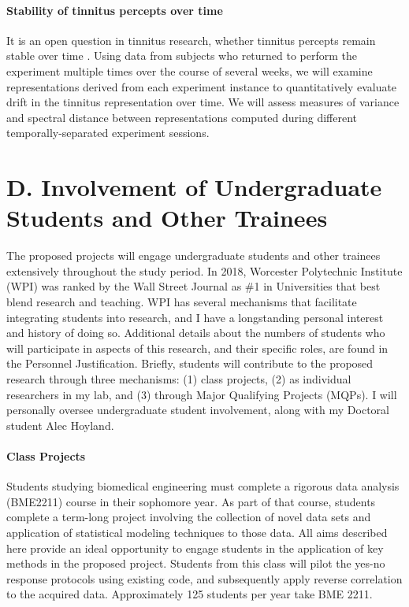 \documentclass[11pt, notitlepage]{article} %
\begin{document}
\paragraph{Stability of tinnitus percepts over time}

It is an open question in tinnitus research, whether tinnitus percepts remain stable over time
\cite{husainReplicabilityNeuralBehavioral2019}.
Using data from subjects who returned to perform the experiment multiple times
over the course of several weeks,
we will examine representations derived from each experiment instance
to quantitatively evaluate drift in the tinnitus representation over time.
We will assess measures of variance and spectral distance between representations
computed during different temporally-separated experiment sessions.

\section*{D. Involvement of Undergraduate Students and Other Trainees}

The proposed projects will engage undergraduate students and other trainees extensively throughout the study period.
In 2018, Worcester Polytechnic Institute (WPI) was ranked by the Wall Street Journal as \#1 in Universities that best blend research and teaching.
WPI has several mechanisms that facilitate integrating students into research, and I have a longstanding personal interest and history of doing so.
Additional details about the numbers of students who will participate in aspects of this research, and their specific roles, are found in the Personnel Justification.
Briefly, students will contribute to the proposed research through three mechanisms: 
(1) class projects, (2) as individual researchers in my lab, and (3) through Major Qualifying Projects (MQPs).
I will personally oversee undergraduate student involvement, along with my Doctoral student Alec Hoyland.

\paragraph{Class Projects}
Students studying biomedical engineering must complete a rigorous data analysis (BME2211) course in their sophomore year. As part of that course, students complete a term-long project involving the collection of novel data sets and application of statistical modeling techniques to those data. All aims described here provide an ideal opportunity to engage students in the application of key methods in the proposed project. Students from this class will pilot the yes-no response protocols using existing code, and subsequently apply reverse correlation to the acquired data. Approximately 125 students per year take BME 2211.
\end{document}
